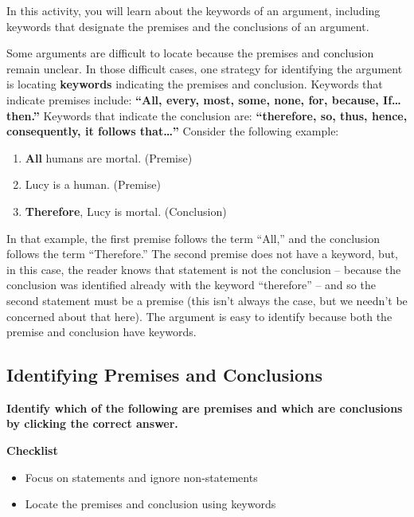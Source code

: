 \documentclass[
]{book}
\providecommand{\tightlist}{%
  \setlength{\itemsep}{0pt}\setlength{\parskip}{0pt}}
\begin{document}
\begin{reflect}
In this activity, you will learn about the keywords of an argument, including keywords that designate the premises and the conclusions of an argument.

Some arguments are difficult to locate because the premises and conclusion remain unclear. In those difficult cases, one strategy for identifying the argument is locating \textbf{keywords} indicating the premises and conclusion. Keywords that indicate premises include: \textbf{``All, every, most, some, none, for, because, If\ldots then.''} Keywords that indicate the conclusion are: \textbf{``therefore, so, thus, hence, consequently, it follows that\ldots{}''} Consider the following example:

\begin{enumerate}
\def\labelenumi{\arabic{enumi}.}
\tightlist
\item
  \textbf{All} humans are mortal. (Premise)
\item
  Lucy is a human. (Premise)
\item
  \textbf{Therefore}, Lucy is mortal. (Conclusion)
\end{enumerate}

In that example, the first premise follows the term ``All,'' and the conclusion follows the term ``Therefore.'' The second premise does not have a keyword, but, in this case, the reader knows that statement is not the conclusion -- because the conclusion was identified already with the keyword ``therefore'' -- and so the second statement must be a premise (this isn't always the case, but we needn't be concerned about that here). The argument is easy to identify because both the premise and conclusion have keywords.

\hypertarget{identifying-premises-and-conclusions}{%
\subsection*{Identifying Premises and Conclusions}\label{identifying-premises-and-conclusions}}

\textbf{Identify which of the following are premises and which are conclusions by clicking the correct answer.}

\textbf{Checklist}

\begin{itemize}
\tightlist
\item
  Focus on statements and ignore non-statements
\item
  Locate the premises and conclusion using keywords
\end{itemize}
\end{reflect}
\end{document}
